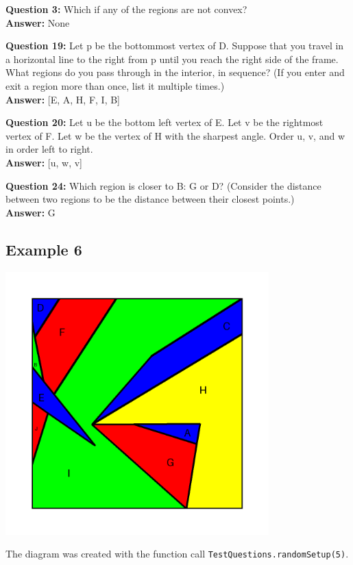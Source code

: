 \documentclass{article}    %
\begin{document}
{\bf Question  3:} Which if any of the regions are not convex? \\
{\bf Answer:}  None

{\bf Question  19:} Let p be the bottommost vertex of D. Suppose that you travel in a horizontal line to the right from p until you reach the right side of the frame. What regions do you pass through in the interior, in sequence? (If you enter and exit a region more than once, list it multiple times.) \\
{\bf Answer:}  [E, A, H, F, I, B]

{\bf Question  20:} Let u be the bottom left vertex of E. Let v be the rightmost vertex of F. Let w be the vertex of H with the sharpest angle. Order u, v, and w in order left to right. \\
{\bf Answer:}  [u, w, v]

{\bf Question  24:} Which region is closer to B: G or D? (Consider the distance between two regions to be the distance between their closest points.) \\
{\bf Answer:}  G

\pagebreak

\subsection{Example 6}
\begin{center}
\includegraphics[height=4in]{Maps/RandomSetup5.png}
\end{center}

{\small  The diagram was created with the function 
call {\tt TestQuestions.randomSetup(5)}.}
\end{document}
